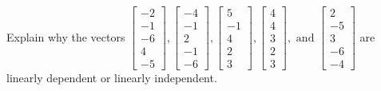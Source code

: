 \documentclass{article}
\begin{document}
\begin{exerciseStatement}
    Explain why the vectors \(\left[\begin{array}{r}
-2 \\
-1 \\
-6 \\
4 \\
-5
\end{array}\right] , \left[\begin{array}{r}
-4 \\
-1 \\
2 \\
-1 \\
-6
\end{array}\right] , \left[\begin{array}{r}
5 \\
-1 \\
4 \\
2 \\
3
\end{array}\right] , \left[\begin{array}{r}
4 \\
4 \\
3 \\
2 \\
3
\end{array}\right] , \text{ and } \left[\begin{array}{r}
2 \\
-5 \\
3 \\
-6 \\
-4
\end{array}\right]\) are linearly dependent or linearly independent.


  
\end{exerciseStatement}
\end{document}

